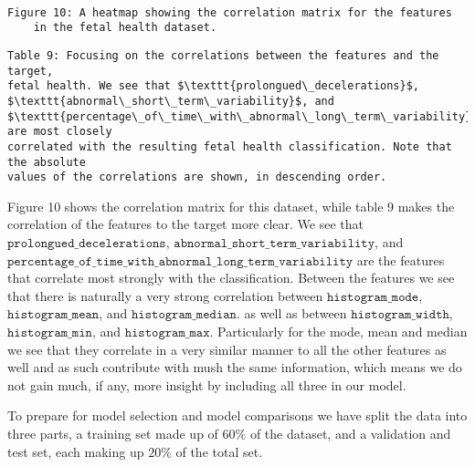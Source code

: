 \documentclass[11pt]{article}
\begin{document}
    \begin{center}
    \end{center}
    { \hspace*{\fill} \\}

 \begin{Verbatim}[commandchars=\\\{\}]
 	Figure 10: A heatmap showing the correlation matrix for the features 
 	in the fetal health dataset.
 \end{Verbatim}
 

\newpage
    \begin{Verbatim}[commandchars=\\\{\}]
Table 9: Focusing on the correlations between the features and the target, 
fetal health. We see that $\texttt{prolongued\_decelerations}$, 
$\texttt{abnormal\_short\_term\_variability}$, and 
$\texttt{percentage\_of\_time\_with\_abnormal\_long\_term\_variability}$ are most closely 
correlated with the resulting fetal health classification. Note that the absolute 
values of the correlations are shown, in descending order.
    \end{Verbatim}

    \begin{center}
\end{center}

        
    Figure 10 shows the correlation matrix for this dataset, while table
9 makes the correlation of the features to the target more clear.
We see that \(\texttt{prolongued\_decelerations}\),
\(\texttt{abnormal\_short\_term\_variability}\), and
\(\texttt{percentage\_of\_time\_with\_abnormal\_long\_term\_variability}\) are
the features that correlate most strongly with the classification. Between the features we see that there is naturally a
very strong correlation between \(\texttt{histogram\_mode}\),
\(\texttt{histogram\_mean}\), and \(\texttt{histogram\_median}\). as well
as between \(\texttt{histogram\_width}\), \(\texttt{histogram\_min}\), and
\(\texttt{histogram\_max}\). Particularly for the mode, mean and median
we see that they correlate in a very similar manner to all the other
features as well and as such contribute with mush the same information,
which means we do not gain much, if any, more insight by including all
three in our model.

To prepare for model selection and model comparisons we have split the data into three parts, a
training set made up of $60\%$ of the dataset, and a validation and test set, each making up $20\%$ of
the total set.
\end{document}
